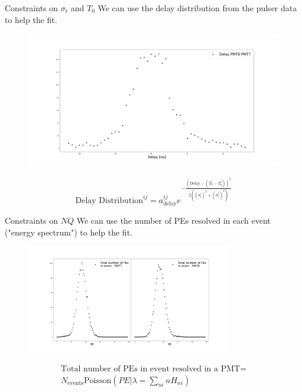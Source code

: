 \documentclass{beamer}
\begin{document}
\begin{frame}{Constraints on $\sigma_t$ and $T_0$}
We can use the delay distribution from the pulser data to help the fit.
\begin{figure}[h]
\includegraphics[width=1\textwidth]{model_delay.png}
\end{figure}
\begin{equation}
\text{Delay Distribution}^{ij}=a_{\text{delay}}^{ij}e^{-\frac{\left(\text{Delay}-(T_0^i-T_0^j)\right)^2}{2\left((\sigma_t^i)^2+(\sigma_t^j)^2\right)}}
\end{equation}
\end{frame}

\begin{frame}{Constraints on $NQ$}
We can use the number of PEs resolved in each event ("energy spectrum") to help the fit.
\begin{figure}[h]
\includegraphics[width=0.8\textwidth]{totalPE.png}
\end{figure}
\begin{equation}
\begin{split}
\text{Total number of PEs in event resolved in a PMT}=\\
N_{\text{events}}\text{Poisson}\left(PE|\lambda=\sum_{ni}nH_{ni}\right)
\end{split}
\end{equation}
\end{frame}
\end{document}
